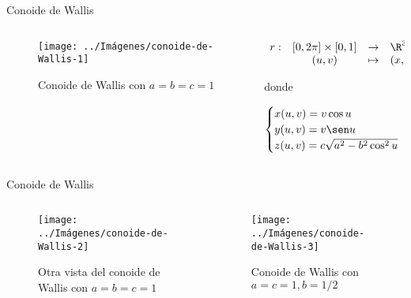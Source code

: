 \documentclass[10pt]{beamer}
\begin{document}
	\begin{frame}{Conoide de Wallis}
		\begin{columns}[t] %
			\begin{column}{.50\textwidth}
				\begin{figure}
					\centering
					\texttt{[image: ../Imágenes/conoide-de-Wallis-1]}
					\caption{Conoide de Wallis con $a=b=c=1$}
					\label{fig:conoide-de-Wallis-1}
				\end{figure}
			\end{column}%
			\hfill%
			\begin{column}{.50\textwidth}
				$$\begin{array}{rcll}
				r : & [0, 2\pi] \times [0,1] & \to & \R^3\\
				& (u,v) & \mapsto & (x,y,z)
				\end{array}$$
				
				donde 
				
				$$ \begin{cases}
				x(u,v) = v \cos u \\
				y(u,v) = v \sen u \\
				z(u,v) = c \sqrt{a^2 - b^2 \cos^2 u}
				\end{cases} $$
			\end{column}%
		\end{columns}
	\end{frame}
	
	\begin{frame}{Conoide de Wallis}
		\begin{columns}[b] %
			\begin{column}{.50\textwidth}
				\begin{figure}
					\centering
					\texttt{[image: ../Imágenes/conoide-de-Wallis-2]}
					\caption{Otra vista del conoide de Wallis con $a=b=c=1$}
					\label{fig:conoide-de-Wallis-2}
				\end{figure}
			\end{column}%
			\hfill%
			\begin{column}{.50\textwidth}
				\begin{figure}
					\centering
					\texttt{[image: ../Imágenes/conoide-de-Wallis-3]}
					\caption{Conoide de Wallis con $a=c=1, b=1/2$}
					\label{fig:conoide-de-Wallis-3}
				\end{figure}
			\end{column}%
		\end{columns}
	\end{frame}
	
\end{document}
